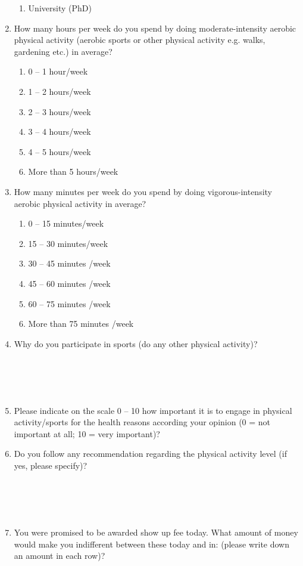 \documentclass[12pt,english]{article}%
\begin{document}
\begin{enumerate}
\begin{enumerate}
	\item University (PhD)
\end{enumerate}
\item How many hours per week do you spend by doing moderate-intensity aerobic physical activity (aerobic sports or other physical activity e.g. walks, gardening etc.) in average?
\begin{enumerate}
\item 0 -- 1 hour/week
\item 1 -- 2 hours/week
\item 2 -- 3 hours/week
\item 3 -- 4 hours/week
\item 4 -- 5 hours/week
\item More than 5 hours/week
\end{enumerate}
\item How many minutes per week do you spend by doing vigorous-intensity aerobic physical activity in average?
\begin{enumerate}
\item 0 -- 15 minutes/week
\item 15 -- 30 minutes/week
\item 30 -- 45 minutes /week
\item 45 -- 60 minutes /week
\item 60 -- 75 minutes /week
\item More than 75 minutes /week
\end{enumerate}
\item Why do you participate in sports (do any other physical activity)?\\\\\\\\\\
\item Please indicate on the scale 0 -- 10 how important it is to engage in physical activity/sports for the health reasons according your opinion (0 = not important at all; 10 = very important)?
\item Do you follow any recommendation regarding the physical activity level (if yes, please specify)?\\\\\\\\\\
\item You were promised to be awarded  show up fee today. What amount of money would make you indifferent between these  today and in: (please write down an amount in each row)?

\end{enumerate}
\end{document}
